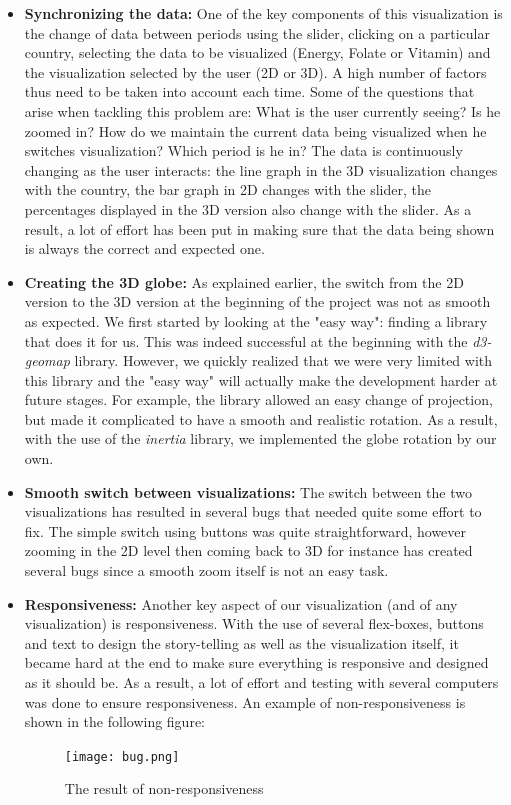 \documentclass[12pt]{article}
\begin{document}
\begin{itemize}
    \item \textbf{Synchronizing the data:} One of the key components of this visualization is the change of data between periods using the slider, clicking on a particular country, selecting the data to be visualized (Energy, Folate or Vitamin) and the visualization selected by the user (2D or 3D). A high number of factors thus need to be taken into account each time. Some of the questions that arise when tackling this problem are: What is the user currently seeing? Is he zoomed in? How do we maintain the current data being visualized when he switches visualization? Which period is he in? \newline
    The data is continuously changing as the user interacts: the line graph in the 3D visualization changes with the country, the bar graph in 2D changes with the slider, the percentages displayed in the 3D version also change with the slider. \newline
    As a result, a lot of effort has been put in making sure that the data being shown is always the correct and expected one.
    \item \textbf{Creating the 3D globe:} As explained earlier, the switch from the 2D version to the 3D version at the beginning of the project was not as smooth as expected. We first started by looking at the "easy way": finding a library that does it for us. This was indeed successful at the beginning with the \textit{d3-geomap} library. However, we quickly realized that we were very limited with this library and the "easy way" will actually make the development harder at future stages. For example, the library allowed an easy change of projection, but made it complicated to have a smooth and realistic rotation. As a result, with the use of the \textit{inertia} library, we implemented the globe rotation by our own.
    \item \textbf{Smooth switch between visualizations:} The switch between the two visualizations has resulted in several bugs that needed quite some effort to fix. The simple switch using buttons was quite straightforward, however zooming in the 2D level then coming back to 3D for instance has created several bugs since a smooth zoom itself is not an easy task.
    \item \textbf{Responsiveness:} Another key aspect of our visualization (and of any visualization) is responsiveness. With the use of several flex-boxes, buttons and text to design the story-telling as well as the visualization itself, it became hard at the end to make sure everything is responsive and designed as it should be. As a result, a lot of effort and testing with several computers was done to ensure responsiveness. An example of non-responsiveness is shown in the following figure: 
    \begin{figure}[!ht]
\centering
\texttt{[image: bug.png]}
\caption{The result of non-responsiveness}
\end{figure} \newline
    
\end{itemize}
\end{document}
